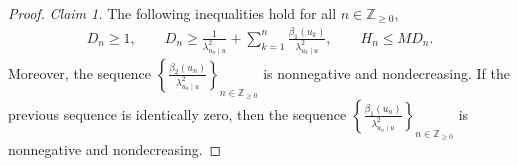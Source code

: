 \documentclass[11pt, reqno, a4paper]{amsart}
\theoremstyle{definition}
\renewcommand{\le}{\leqslant}
\renewcommand{\ge}{\geqslant}
\newcommand{\Z}{\mathbb Z}
\numberwithin{equation}{section}
\begin{document}
\begin{proof}
    \textit{Claim 1.} The following inequalities hold for all $n \in \Z_{\ge 0}$,
    \begin{equation*}
        \begin{gathered}
            D_n \ge 1, \qquad 
            D_n \ge \frac{1}{\lambda_{u_n \mid u} ^{2}} + \sum_{k=1}^{n} \frac{\beta_1 (u_k)}{\lambda_{u_k \mid u} ^{2}}, \qquad H_n \le MD_n.
        \end{gathered}
    \end{equation*}
    Moreover, the sequence $\left\{ \frac{\beta_2 (u_n)}{\lambda_{u_n \mid u} ^2} \right\}_{n \in \Z_{\ge 0}}$ is nonnegative and nondecreasing. If the previous sequence is identically zero, then the sequence $\left\{ \frac{\beta_1 (u_n)}{\lambda_{u_n \mid u} ^2} \right\}_{n \in \Z_{\ge 0}}$ is nonnegative and nondecreasing.


\end{proof}
\end{document}
